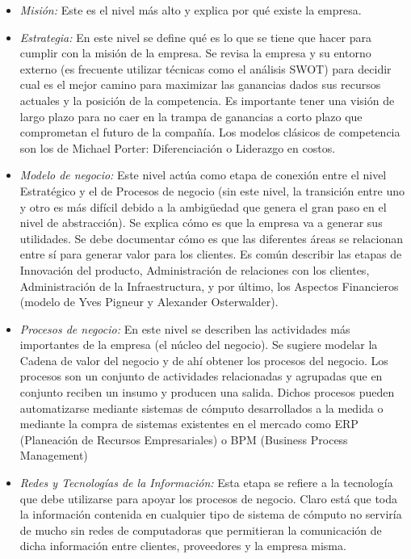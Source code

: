\begin{itemize}
	\item \emph{Misión:}
		Este es el nivel más alto y explica por qué existe la empresa.
	\item \emph{Estrategia:}
		En este nivel se define qué es lo que se tiene que hacer para cumplir con la misión de la empresa. Se revisa la empresa
		y su entorno externo (es frecuente utilizar técnicas como el análisis SWOT) para decidir cual es el mejor camino para
		maximizar las ganancias dados sus recursos actuales y la posición de la competencia. Es importante tener una visión de
		largo plazo para no caer en la trampa de ganancias a corto plazo que comprometan el futuro de la compañía. Los modelos
		clásicos de competencia son los de Michael Porter: Diferenciación o Liderazgo en costos.
	\item \emph{Modelo de negocio:}
		Este nivel actúa como etapa de conexión entre el nivel Estratégico y el de Procesos de negocio (sin este nivel, la transición
		entre uno y otro es más difícil debido a la ambigüedad que genera el gran paso en el nivel de abstracción). Se explica cómo
		es que la empresa va a generar sus utilidades. Se debe documentar cómo es que las diferentes áreas se relacionan entre sí para
		generar valor para los clientes. Es común describir las etapas de Innovación del producto, Administración de relaciones con los
		clientes, Administración de la Infraestructura, y por último, los Aspectos Financieros (modelo de Yves Pigneur y Alexander
		Osterwalder).
	\item \emph{Procesos de negocio:}
		En este nivel se describen las actividades más importantes de la empresa (el núcleo del negocio). Se sugiere modelar la Cadena
		de valor del negocio y de ahí obtener los procesos del negocio. Los procesos son un conjunto de actividades relacionadas y
		agrupadas que en conjunto reciben un insumo y producen una salida. Dichos procesos pueden automatizarse mediante sistemas de
		cómputo desarrollados a la medida o mediante la compra de sistemas existentes en el mercado como ERP (Planeación de Recursos
		Empresariales) o BPM (Business Process Management)
	\item \emph{Redes y Tecnologías de la Información:}
		Esta etapa se refiere a la tecnología que debe utilizarse para apoyar los procesos de negocio. Claro está que toda la información
		contenida en cualquier tipo de sistema de cómputo no serviría de mucho sin redes de computadoras que permitieran la comunicación
		de dicha información entre clientes, proveedores y la empresa misma.
\end{itemize}
\newpage
